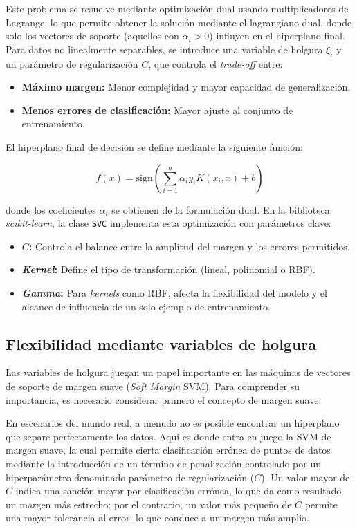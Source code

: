Este problema se resuelve mediante optimización dual usando multiplicadores de Lagrange, lo que permite obtener la solución mediante el lagrangiano dual, donde solo los vectores de soporte (aquellos con $\alpha_i > 0$) influyen en el hiperplano final. Para datos no linealmente separables, se introduce una variable de holgura $\xi_i$ y un parámetro de regularización $C$, que controla el \textit{trade-off} entre:

\begin{itemize}
\item \textbf{Máximo margen:} Menor complejidad y mayor capacidad de generalización.
\item \textbf{Menos errores de clasificación:} Mayor ajuste al conjunto de entrenamiento.
\end{itemize}

El hiperplano final de decisión se define mediante la siguiente función:

\begin{equation}
f(x) = \text{sign} \left( \sum_{i=1}^{n} \alpha_i y_i K(x_i, x) + b \right)
\end{equation}

\noindent donde los coeficientes $\alpha_i$ se obtienen de la formulación dual. En la biblioteca \textit{scikit-learn}, la clase \texttt{SVC} implementa esta optimización con parámetros clave:

\begin{itemize}
\item \textbf{$C$:} Controla el balance entre la amplitud del margen y los errores permitidos.
\item \textbf{\textit{Kernel}:} Define el tipo de transformación (lineal, polinomial o RBF).
\item \textbf{\textit{Gamma}:} Para \textit{kernels} como RBF, afecta la flexibilidad del modelo y el alcance de influencia de un solo ejemplo de entrenamiento.
\end{itemize}

\subsection{Flexibilidad mediante variables de holgura}

Las variables de holgura juegan un papel importante en las máquinas de vectores de soporte de margen suave (\textit{Soft Margin} SVM). Para comprender su importancia, es necesario considerar primero el concepto de margen suave.

En escenarios del mundo real, a menudo no es posible encontrar un hiperplano que separe perfectamente los datos. Aquí es donde entra en juego la SVM de margen suave, la cual permite cierta clasificación errónea de puntos de datos mediante la introducción de un término de penalización controlado por un hiperparámetro denominado parámetro de regularización ($C$). Un valor mayor de $C$ indica una sanción mayor por clasificación errónea, lo que da como resultado un margen más estrecho; por el contrario, un valor más pequeño de $C$ permite una mayor tolerancia al error, lo que conduce a un margen más amplio.


